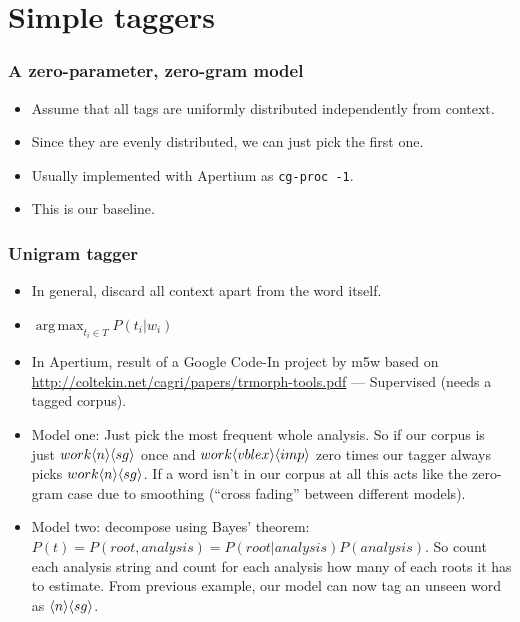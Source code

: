 \documentclass{beamer}
\DeclareMathOperator*{\argmax}{arg\,max}
\newcommand{\mtag}[1]{%
\mathchardef\mhyphen="2D %
\ensuremath{\langle{}#1\rangle{}}}
\begin{document}
\section{Simple taggers}
\begin{frame}
\frametitle{A zero-parameter, zero-gram model}
\begin{itemize}

  \item Assume that all tags are uniformly distributed independently from
    context.

  \item Since they are evenly distributed, we can just pick the first one.

  \item Usually implemented with Apertium as \texttt{cg-proc -1}.

  \item This is our baseline.

\end{itemize}
\end{frame}

\begin{frame}
\frametitle{Unigram tagger}
\begin{itemize}

  \item In general, discard all context apart from the word itself.

  \item $\argmax_{t_i\in{}T}{P(t_i|w_i)}$

  \item In Apertium, result of a Google Code-In project by m5w based on
    \url{http://coltekin.net/cagri/papers/trmorph-tools.pdf} --- Supervised
    (needs a tagged corpus).

  \item Model one: Just pick the most frequent whole analysis. So if our corpus
    is just $work\mtag{n}\mtag{sg}$ once and $work\mtag{vblex}\mtag{imp}$ zero
    times our tagger always picks $work\mtag{n}\mtag{sg}$. If a word isn't in
    our corpus at all this acts like the zero-gram case due to smoothing
    (``cross fading'' between different models).

  \item Model two: decompose using Bayes' theorem: $P(t) = P(root, analysis) =
    P(root|analysis)P(analysis)$. So count each analysis string and count for
    each analysis how many of each roots it has to estimate. From previous
    example, our model can now tag an unseen word as $\mtag{n}\mtag{sg}$.

\end{itemize}
\end{frame}
\end{document}
